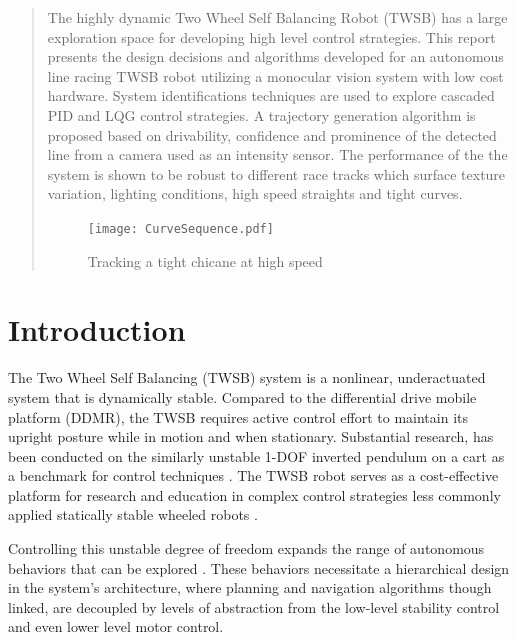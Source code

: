     \begin{abstract} %
    The highly dynamic Two Wheel Self Balancing Robot 
    (TWSB) has a large exploration space for developing high level 
    control strategies. 
    This report presents the design decisions and algorithms developed for
    an autonomous line racing TWSB robot utilizing a monocular vision system with low cost hardware. 
    System identifications techniques are used to explore
    cascaded PID and LQG control strategies.
    A trajectory generation algorithm is proposed based on drivability, confidence 
    and prominence of the detected line from a camera used as an intensity sensor. 
    The performance of the the system is shown to be robust to different race tracks which
    surface texture variation, lighting conditions, high speed straights and tight curves. 

    \begin{figure}[H]
    \centering
    \texttt{[image: CurveSequence.pdf]}
    \caption{Tracking a tight chicane at high speed}
    \end{figure}

  \end{abstract}%
  \clearpage
    \section{Introduction}
    The Two Wheel Self Balancing (TWSB) system is a nonlinear, underactuated system that is dynamically stable.
    Compared to the differential drive mobile platform (DDMR), the TWSB requires active control effort
    to maintain its upright posture while in motion and when stationary.
    Substantial research, has been conducted on the similarly unstable 1-DOF inverted pendulum on a cart 
    as a benchmark for control techniques \cite{boubaker2013inverted}. 
    The TWSB robot serves as a cost-effective platform for research and education in complex control 
    strategies less commonly applied statically stable wheeled robots \cite{educationPlatform}.
    
    Controlling this unstable degree of freedom expands the range of autonomous behaviors that 
    can be explored \cite{RoboLimbo} \cite{jeong2008wheeled} \cite{Browning2004TurningSI}. 
    These behaviors necessitate a hierarchical design in the system's architecture,
    where planning and navigation algorithms though linked, are decoupled by levels of abstraction 
    from the low-level stability control and even lower level motor control.
    
